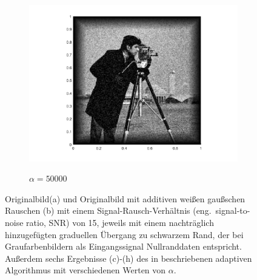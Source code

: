 \begin{figure}[!ht]
\begin{subfigure}{.32\linewidth}
    \caption{$\alpha=50000$}
    \includegraphics[trim = 100 30 80 20, clip, width=\linewidth]
      {pictures/chapIntroduction/denoiseSNR15/alpha50000/solutionGrayscale.png}
    \label{fig:snr15alpha50000}
  \end{subfigure}
  \caption{Originalbild\protect\footnotemark (a) und Originalbild mit additiven
    weißen gaußschen Rauschen (b) mit einem Signal-Rausch-Verhältnis (eng.\
    signal-to-noise ratio, SNR) von 15, jeweils mit einem nachträglich
    hinzugefügten graduellen Übergang zu schwarzem Rand, der bei
    Graufarbenbildern als Eingangssignal Nullranddaten entspricht. 
    Außerdem sechs Ergebnisse (c)-(h) des in 
    beschriebenen adaptiven Algorithmus mit verschiedenen Werten von $\alpha$.}
  \label{fig:exampleDenoising}
\end{figure}

